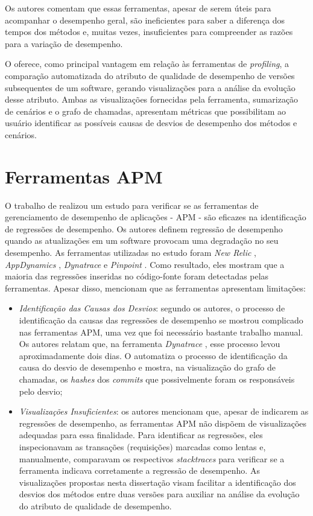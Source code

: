 Os autores comentam que essas ferramentas, apesar de serem úteis para acompanhar o desempenho geral, são ineficientes para saber a diferença dos tempos dos métodos e, muitas vezes, insuficientes para compreender as razões para a variação de desempenho.

O {\textit{\toolName}} oferece, como principal vantagem em relação às ferramentas de \textit{profiling}, a comparação automatizada do atributo de qualidade de desempenho de versões subsequentes de um software, gerando visualizações para a análise da evolução desse atributo. Ambas as visualizações fornecidas pela ferramenta, sumarização de cenários e o grafo de chamadas, apresentam métricas que possibilitam ao usuário identificar as possíveis causas de desvios de desempenho dos métodos e cenários.

\section{Ferramentas APM} \label{sec:trabalhos-relacionados-ferramentas-apm}

O trabalho de \citeauthor{Ahmed2016} realizou um estudo para verificar se as ferramentas de gerenciamento de desempenho de aplicações - APM - são eficazes na identificação de regressões de desempenho. Os autores definem regressão de desempenho quando as atualizações em um software provocam uma degradação no seu desempenho. As ferramentas utilizadas no estudo foram \textit{New Relic} \cite{Relic2016}, \textit{AppDynamics} \cite{Appdynamics}, \textit{Dynatrace} \cite{Dynatrace2016} e \textit{Pinpoint} \cite{Pinpoint2016}. Como resultado, eles mostram que a maioria das regressões inseridas no código-fonte foram detectadas pelas ferramentas. Apesar disso, \citeauthor{Ahmed2016} mencionam que as ferramentas apresentam limitações:
\begin{itemize}
   \item \textit{Identificação das Causas dos Desvios}: segundo os autores, o processo de identificação da causas das regressões de desempenho se mostrou complicado nas ferramentas APM, uma vez que foi necessário bastante trabalho manual. Os autores relatam que, na ferramenta \textit{Dynatrace} \cite{Dynatrace2016}, esse processo levou aproximadamente dois dias. O {\textit{\toolName}} automatiza o processo de identificação da causa do desvio de desempenho e mostra, na visualização do grafo de chamadas, os \textit{hashes} dos \textit{commits} que possivelmente foram os responsáveis pelo desvio;   
   \item \textit{Visualizações Insuficientes}: os autores mencionam que, apesar de indicarem as regressões de desempenho, as ferramentas APM não dispõem de visualizações adequadas para essa finalidade. Para identificar as regressões, eles inspecionavam as transações (requisições) marcadas como lentas e, manualmente, comparavam os respectivos \textit{stacktraces} para verificar se a ferramenta indicava corretamente a regressão de desempenho. As visualizações propostas nesta dissertação visam facilitar a identificação dos desvios dos métodos entre duas versões para auxiliar na análise da evolução do atributo de qualidade de desempenho.
\end{itemize}

